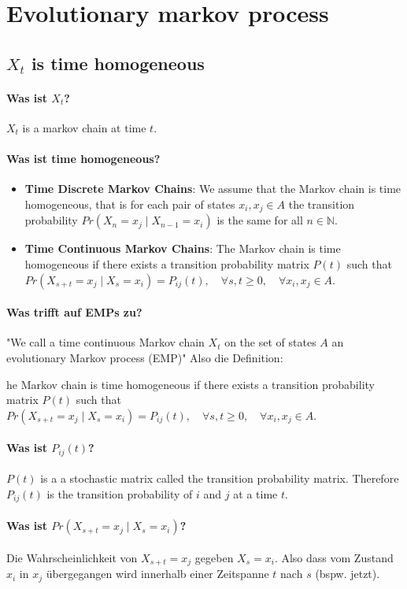 \newpage
\section{Evolutionary markov process}
\subsection{$X_t$ is time homogeneous}
\paragraph{Was ist $X_t$?}
$X_t$ is a markov chain at time $t$.
\paragraph{Was ist time homogeneous?} 
\begin{itemize}
    \item \textbf{Time Discrete Markov Chains}: We assume that the Markov chain is time homogeneous, that is for each pair of states $x_i , x_j \in A$ the transition probability $Pr(X_n = x_j \mid X_{n-1} = x_i)$ is the same for all $n \in \mathbb{N}$.
    \item \textbf{Time Continuous Markov Chains}: The Markov chain is time homogeneous if there exists a transition probability matrix $P(t)$ such that $Pr(X_{s+t} = x_j \mid X_s = x_i ) = P_{ij} (t), \quad \forall s, t \geq 0, \quad \forall x_i , x_j \in A$.
\end{itemize}
\paragraph{Was trifft auf EMPs zu?}
"We call a time continuous Markov chain $X_t$ on the set of states $A$ an evolutionary Markov process (EMP)" Also die Definition: \begin{center}
    he Markov chain is time homogeneous if there exists a transition probability matrix $P(t)$ such that $Pr(X_{s+t} = x_j \mid X_s = x_i ) = P_{ij} (t), \quad \forall s, t \geq 0, \quad \forall x_i , x_j \in A$.
\end{center}
\paragraph{Was ist $P_{ij}(t)$?} 
$P(t)$ is a a stochastic matrix called the transition probability matrix. Therefore $P_{ij}(t)$ is the transition probability of $i$ and $j$ at a time $t$. 
\paragraph{Was ist $Pr(X_{s+t} = x_j \mid X_s = x_i )$?}
Die Wahrscheinlichkeit von $X_{s+t} = x_j$ gegeben $X_s = x_i$. Also dass vom Zustand $x_i$ in $x_j$ übergegangen wird innerhalb einer Zeitspanne $t$ nach $s$ (bspw. jetzt).
